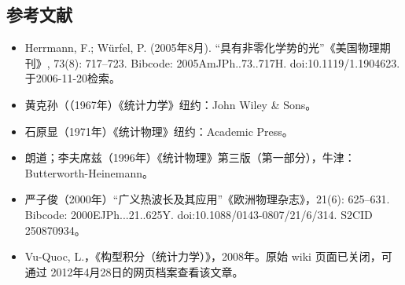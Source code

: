 \subsection{参考文献}  
\begin{itemize}
\item Herrmann, F.; Würfel, P. (2005年8月). “具有非零化学势的光”《美国物理期刊》, 73(8): 717–723. Bibcode: 2005AmJPh..73..717H. doi:10.1119/1.1904623. 于2006-11-20检索。  
\item 黄克孙（（1967年）《统计力学》纽约：John Wiley & Sons。  
\item 石原显（1971年）《统计物理》纽约：Academic Press。  
\item 朗道；李夫席兹（1996年）《统计物理》第三版（第一部分），牛津：Butterworth-Heinemann。  
\item 严子俊（2000年）“广义热波长及其应用”《欧洲物理杂志》，21(6): 625–631. Bibcode: 2000EJPh...21..625Y. doi:10.1088/0143-0807/21/6/314. S2CID 250870934。  
\item Vu-Quoc, L.，《构型积分（统计力学）》，2008年。原始 wiki 页面已关闭，可通过 2012年4月28日的网页档案查看该文章。
\end{itemize}